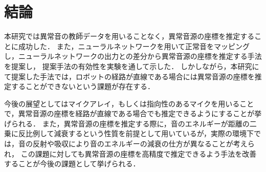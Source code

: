 \documentclass[../main]{subfiles}
\begin{document}
\graphicspath{{../figures}}

\section{結論}
本研究では異常音の教師データを用いることなく，異常音源の座標を推定することに成功した．
また，ニューラルネットワークを用いて正常音をマッピングし，ニューラルネットワークの出力との差分から異常音源の座標を推定する手法を提案し，
提案手法の有効性を実験を通して示した．
しかしながら，本研究にて提案した手法では，ロボットの経路が直線である場合には異常音源の座標を推定することができないという課題が存在する．


今後の展望としてはマイクアレイ，もしくは指向性のあるマイクを用いることで，異常音源の座標を経路が直線である場合でも推定できるようにすることが挙げられる．
また，異常音源の座標を推定する際に，音のエネルギーが距離の二乗に反比例して減衰するという性質を前提として用いているが，実際の環境下では，音の反射や吸収により音のエネルギーの減衰の仕方が異なることが考えられ，
この課題に対しても異常音源の座標を高精度で推定できるよう手法を改善することが今後の課題として挙げられる．
\end{document}
